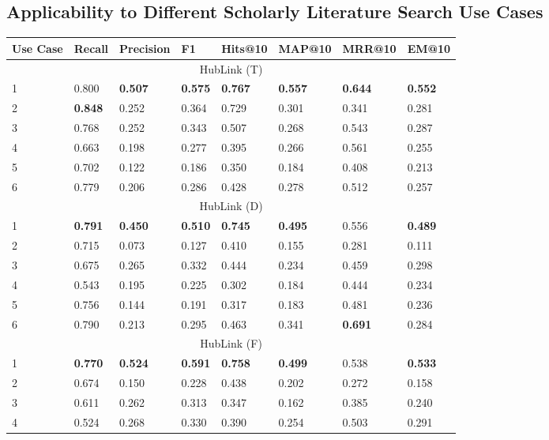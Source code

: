 \subsection{Applicability to Different Scholarly Literature Search Use Cases}


\begin{table}[t]
\centering
\begin{tabular}{@{}llllllll@{}}
\toprule
Use Case & Recall & Precision & F1 & Hits@10 & MAP@10 & MRR@10 & EM@10 \\ 
\midrule
\multicolumn{8}{c}{HubLink (T)} \\
\midrule
1 & 0.800 & \textbf{0.507} & \textbf{0.575} & \textbf{0.767} & \textbf{0.557} & \textbf{0.644} & \textbf{0.552} \\
2 & \textbf{0.848} & 0.252 & 0.364 & 0.729 & 0.301 & 0.341 & 0.281 \\
3 & 0.768 & 0.252 & 0.343 & 0.507 & 0.268 & 0.543 & 0.287 \\
4 & 0.663 & 0.198 & 0.277 & 0.395 & 0.266 & 0.561 & 0.255 \\
5 & 0.702 & 0.122 & 0.186 & 0.350 & 0.184 & 0.408 & 0.213 \\
6 & 0.779 & 0.206 & 0.286 & 0.428 & 0.278 & 0.512 & 0.257 \\
\midrule
\multicolumn{8}{c}{HubLink (D)} \\
\midrule
1 & \textbf{0.791} & \textbf{0.450} & \textbf{0.510} & \textbf{0.745} & \textbf{0.495} & 0.556 & \textbf{0.489} \\
2 & 0.715 & 0.073 & 0.127 & 0.410 & 0.155 & 0.281 & 0.111 \\
3 & 0.675 & 0.265 & 0.332 & 0.444 & 0.234 & 0.459 & 0.298 \\
4 & 0.543 & 0.195 & 0.225 & 0.302 & 0.184 & 0.444 & 0.234 \\
5 & 0.756 & 0.144 & 0.191 & 0.317 & 0.183 & 0.481 & 0.236 \\
6 & 0.790 & 0.213 & 0.295 & 0.463 & 0.341 & \textbf{0.691} & 0.284 \\
\midrule
\multicolumn{8}{c}{HubLink (F)} \\
\midrule
1 & \textbf{0.770} & \textbf{0.524} & \textbf{0.591} & \textbf{0.758} & \textbf{0.499} & 0.538 & \textbf{0.533} \\
2 & 0.674 & 0.150 & 0.228 & 0.438 & 0.202 & 0.272 & 0.158 \\
3 & 0.611 & 0.262 & 0.313 & 0.347 & 0.162 & 0.385 & 0.240 \\
4 & 0.524 & 0.268 & 0.330 & 0.390 & 0.254 & 0.503 & 0.291 \\

\end{tabular}
\end{table}
